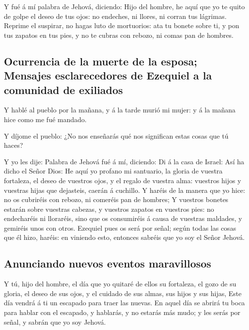  Y fué á mí palabra de Jehová, diciendo: 
Hijo del hombre, he aquí que yo te quito de golpe el deseo de tus ojos:
no endeches, ni llores, ni corran tus lágrimas.  Reprime
el suspirar, no hagas luto de mortuorios: ata tu bonete sobre ti, y pon
tus zapatos en tus pies, y no te cubras con rebozo, ni comas pan de
hombres.

\hypertarget{ocurrencia-de-la-muerte-de-la-esposa-mensajes-esclarecedores-de-ezequiel-a-la-comunidad-de-exiliados}{%
\subsection{Ocurrencia de la muerte de la esposa; Mensajes
esclarecedores de Ezequiel a la comunidad de
exiliados}\label{ocurrencia-de-la-muerte-de-la-esposa-mensajes-esclarecedores-de-ezequiel-a-la-comunidad-de-exiliados}}

 Y hablé al pueblo por la mañana, y á la tarde murió mi
mujer: y á la mañana hice como me fué mandado.

 Y díjome el pueblo: ¿No nos enseñarás qué nos significan
estas cosas que tú haces?

 Y yo les dije: Palabra de Jehová fué á mí, diciendo:
 Di á la casa de Israel: Así ha dicho el Señor Dios: He
aquí yo profano mi santuario, la gloria de vuestra fortaleza, el deseo
de vuestros ojos, y el regalo de vuestra alma: vuestros hijos y vuestras
hijas que dejasteis, caerán á cuchillo.  Y haréis de la
manera que yo hice: no os cubriréis con rebozo, ni comeréis pan de
hombres;  Y vuestros bonetes estarán sobre vuestras
cabezas, y vuestros zapatos en vuestros pies: no endecharéis ni
lloraréis, sino que os consumiréis á causa de vuestras maldades, y
gemiréis unos con otros.  Ezequiel pues os será por
señal; según todas las cosas que él hizo, haréis: en viniendo esto,
entonces sabréis que yo soy el Señor Jehová.

\hypertarget{anunciando-nuevos-eventos-maravillosos}{%
\subsection{Anunciando nuevos eventos
maravillosos}\label{anunciando-nuevos-eventos-maravillosos}}

 Y tú, hijo del hombre, el día que yo quitaré de ellos su
fortaleza, el gozo de su gloria, el deseo de sus ojos, y el cuidado de
sus almas, sus hijos y sus hijas,  Este día vendrá á ti
un escapado para traer las nuevas.  En aquel día se
abrirá tu boca para hablar con el escapado, y hablarás, y no estarás más
mudo; y les serás por señal, y sabrán que yo soy Jehová.

